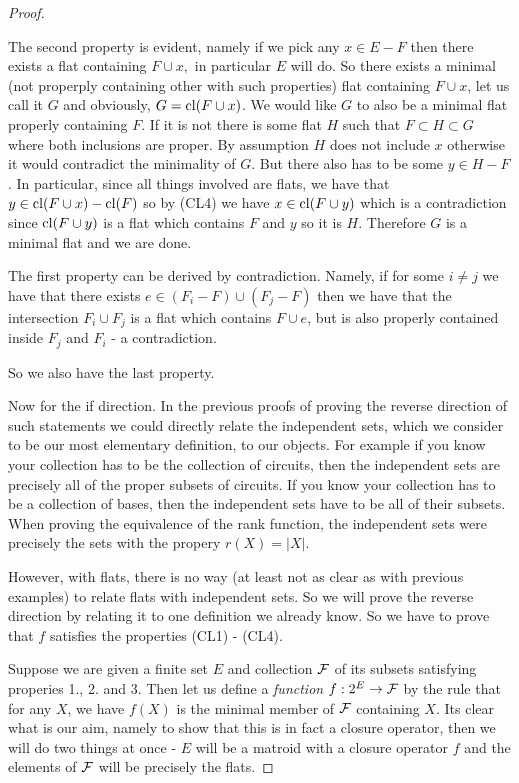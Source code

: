 \begin{proof}
\begin{enumerate}
    The second property is evident, namely if we pick any $x \in E - F$ then there exists a flat containing $F \cup x, $ in particular $E$ will do. So there exists a minimal (not properply containing other with such properties) flat containing $F \cup x$, let us call it $G$ and obviously, $G = \mathrm{cl}(F \cup x)$. We would like $G$ to also be a minimal flat properly containing $F$. If it is not there is some flat $H$ such that $F \subset H \subset G$ where both inclusions are proper. By assumption $H$ does not include $x$ otherwise it would contradict the minimality of $G.$ But there also has to be some $y \in H - F$. In particular, since all things involved are flats, we have that $y \in \mathrm{cl}(F \cup x) - \mathrm{cl}(F)$ so by (CL4) we have $x \in \mathrm{cl}(F \cup y)$ which is a contradiction since $\mathrm{cl}(F \cup y)$ is a flat which contains $F$ and $y$ so it is $H.$  Therefore $G$ is a minimal flat and we are done.

    The first property can be derived by contradiction. Namely, if for some $i\neq j$ we have that there exists $e \in (F_i - F)\cup(F_j - F)$ then we have that the intersection $F_i \cup F_j$ is a flat which contains $F\cup e$, but is also properly contained inside $F_j$ and $F_i$ - a contradiction.

    So we also have the last property.
    
\end{enumerate}

    Now for the if direction. In the previous proofs of proving the reverse direction of such statements we could directly relate the independent sets, which we consider to be our most elementary definition, to our objects. For example if you know your collection has to be the collection of circuits, then the independent sets are precisely all of the proper subsets of circuits. If you know your collection has to be a collection of bases, then the independent sets have to be all of their subsets. When proving the equivalence of the rank function, the independent sets were precisely the sets with the propery $r(X) = |X|$. 

    However, with flats, there is no way (at least not as clear as with previous examples) to relate flats with independent sets. So we will prove the reverse direction by relating it to one definition we already know. So we have to prove that $f$ satisfies the properties (CL1) - (CL4).

    Suppose we are given a finite set $E$ and collection $\mathcal{F}$ of its subsets satisfying properies 1., 2. and 3. Then let us define a \textit{function} $f: 2^E \to \mathcal{F}$ by the rule that for any $X$, we have $f(X)$ is the minimal member of $\mathcal{F}$ containing $X$. Its clear what is our aim, namely to show that this is in fact a closure operator, then we will do two things at once - $E$ will be a matroid with a closure operator $f$ and the elements of $\mathcal{F}$ will be precisely the flats.


\end{proof}
